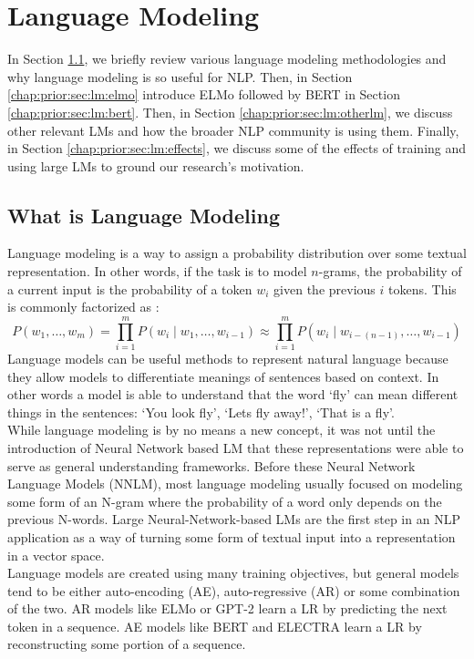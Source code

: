 \section{Language Modeling}
\label{chap:prior:sec:lm}
In Section \ref{chap:prior:sec:lm:overview}, we briefly review various language modeling methodologies and why language modeling is so useful for NLP. Then, in Section \ref{chap:prior:sec:lm:elmo} introduce ELMo followed by BERT in Section \ref{chap:prior:sec:lm:bert}. Then, in Section \ref{chap:prior:sec:lm:otherlm}, we discuss other relevant LMs and how the broader NLP community is using them. Finally, in Section \ref{chap:prior:sec:lm:effects}, we discuss some of the effects of training and using large LMs to ground our research's motivation.
\subsection{What is Language Modeling}
\label{chap:prior:sec:lm:overview}
Language modeling is a way to assign a probability distribution over some textual representation. In other words, if the task is to model $n$-grams, the probability of a current input is the probability of a token $w_i$ given the previous $i$ tokens. This is commonly factorized as :
\begin{equation}
    P(w_{1},\ldots ,w_{m})=\prod _{i=1}^{m}P(w_{i}\mid w_{1},\ldots ,w_{i-1})\approx \prod _{i=1}^{m}P(w_{i}\mid w_{i-(n-1)},\ldots ,w_{i-1})
\label{equation:langmodel}
\end{equation} Language models can be useful methods to represent natural language because they allow models to differentiate meanings of sentences based on context. In other words a model is able to understand that the word `fly' can mean different things in the sentences: `You look fly', `Lets fly away!', `That is a fly'. \\
While language modeling is by no means a new concept, it was not until the introduction of Neural Network based LM that these representations were able to serve as general understanding frameworks. Before these Neural Network Language Models (NNLM), most language modeling usually focused on modeling some form of an N-gram where the probability of a word only depends on the previous N-words. Large Neural-Network-based LMs are the first step in an NLP application as a way of turning some form of textual input into a representation in a vector space. \\
Language models are created using many training objectives, but general models tend to be either auto-encoding (AE), auto-regressive (AR) or some combination of the two. AR models like ELMo \cite{Peters2018DeepCW} or GPT-2 \cite{Radford2019LanguageMA} learn a LR by predicting the next token in a sequence. AE models like BERT \cite{Devlin2019BERTPO} and ELECTRA \cite{Clark2020ELECTRAPT} learn a LR by reconstructing some portion of a sequence.
